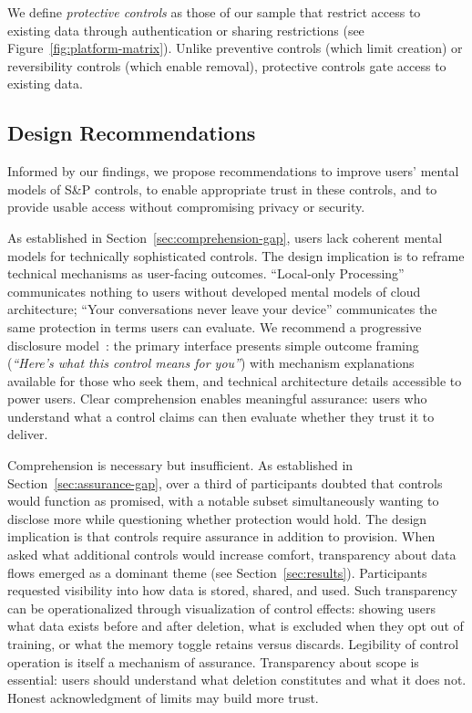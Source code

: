 \documentclass[letterpaper,twocolumn,10pt]{article}
\begin{document}
 We define \textit{protective controls} as those of our sample that restrict access to existing data through authentication or sharing restrictions (see Figure~\ref{fig:platform-matrix}). Unlike preventive controls (which limit creation) or reversibility controls (which enable removal), protective controls gate access to existing data.

\subsection{Design Recommendations} \label{sec:design-recommendations}
Informed by our findings, we propose recommendations to improve users’ mental models of S\&P controls, to enable appropriate trust in these controls, and to provide usable access without compromising privacy or security.

 As established in Section~\ref{sec:comprehension-gap}, users lack coherent mental models for technically sophisticated controls. The design implication is to reframe technical mechanisms as user-facing outcomes. ``Local-only Processing'' communicates nothing to users without developed mental models of cloud architecture; ``Your conversations never leave your device'' communicates the same protection in terms users can evaluate. We recommend a progressive disclosure model~\cite{springer2020progressive}: the primary interface presents simple outcome framing (\textit{``Here's what this control means for you''}) with mechanism explanations available for those who seek them, and technical architecture details accessible to power users. Clear comprehension enables meaningful assurance: users who understand what a control claims can then evaluate whether they trust it to deliver.

 Comprehension is necessary but insufficient. As established in Section~\ref{sec:assurance-gap}, over a third of participants doubted that controls would function as promised, with a notable subset simultaneously wanting to disclose more while questioning whether protection would hold. The design implication is that controls require assurance in addition to provision. When asked what additional controls would increase comfort, transparency about data flows emerged as a dominant theme (see Section~\ref{sec:results}). Participants requested visibility into how data is stored, shared, and used. Such transparency can be operationalized through visualization of control effects: showing users what data exists before and after deletion, what is excluded when they opt out of training, or what the memory toggle retains versus discards. Legibility of control operation is itself a mechanism of assurance. Transparency about scope is essential: users should understand what deletion constitutes and what it does not. Honest acknowledgment of limits may build more trust.
\end{document}

